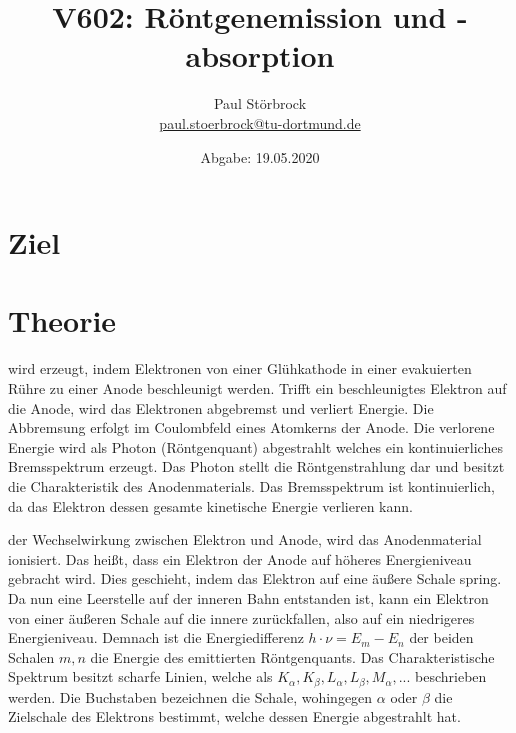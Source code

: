 
\usepackage{tikz}

\newcommand*\circled[1]{\tikz[baseline=(char.base)]{
            \node[shape=circle,draw,inner sep=2pt] (char) {#1};}}


    \title{V602: Röntgenemission und -absorption}
    \author{  
    Paul Störbrock\\
    \texorpdfstring{\href{mailto:paul.stoerbrock@tu-dortmund.de}{paul.stoerbrock@tu-dortmund.de}}{}
    }
    \date{Abgabe: 19.05.2020\vspace{-4ex}}
\maketitle
    
\newpage
\tableofcontents
\newpage

\setcounter{page}{1}

\section{Ziel}

\section{Theorie}

\justifying wird erzeugt, indem Elektronen von einer Glühkathode in einer evakuierten Rühre zu einer
Anode beschleunigt werden. Trifft ein beschleunigtes Elektron auf die Anode, wird das Elektronen abgebremst und verliert Energie. Die Abbremsung
erfolgt im Coulombfeld eines Atomkerns der Anode. Die verlorene Energie wird als Photon (Röntgenquant) abgestrahlt welches ein kontinuierliches 
Bremsspektrum erzeugt. Das Photon stellt die Röntgenstrahlung dar und besitzt die Charakteristik des Anodenmaterials. Das Bremsspektrum ist 
kontinuierlich, da das Elektron dessen gesamte kinetische Energie verlieren kann. 

\justifying der Wechselwirkung zwischen Elektron und Anode, wird das Anodenmaterial ionisiert. Das heißt, dass ein Elektron der
Anode auf höheres Energieniveau gebracht wird. Dies geschieht, indem das Elektron auf eine äußere Schale spring. Da nun eine Leerstelle auf der
inneren Bahn entstanden ist, kann ein Elektron von einer äußeren Schale auf die innere zurückfallen, also auf ein niedrigeres Energieniveau.
Demnach ist die Energiedifferenz $h\cdot\nu=E_m - E_n$ \cite{V602} der beiden Schalen $m,n$ die Energie des emittierten Röntgenquants. 
Das Charakteristische Spektrum besitzt scharfe Linien, welche als $K_{\alpha}, K_{\beta}, L_{\alpha}, L_{\beta}, M_{\alpha},...$ beschrieben werden. 
Die Buchstaben bezeichnen die Schale, wohingegen $\alpha$ oder $\beta$ die Zielschale des Elektrons bestimmt, welche dessen Energie abgestrahlt 
hat. 

